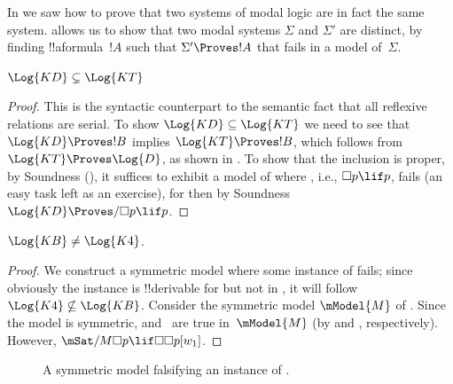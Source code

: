 \documentclass[../../../include/open-logic-section]{subfiles}
\begin{document}


In  we saw how to prove that two systems of modal
logic are in fact the same system.  allows
us to show that two modal systems $\Sigma$ and $\Sigma'$ are distinct,
by finding !!a{formula}~$!A$ such that $\Sigma' \Proves !A$ that fails in
a model of~$\Sigma$.

\begin{prop}
  $\Log{KD} \subsetneq \Log{KT}$
\end{prop}

\begin{proof} This is the syntactic counterpart to the semantic fact
  that all reflexive relations are serial. To show $\Log{KD} \subseteq
  \Log{KT}$ we need to see that $\Log{KD} \Proves !B$ implies
  $\Log{KT} \Proves !B$, which follows from $\Log{KT} \Proves
  \Log{D}$, as shown in
  .  To show
  that the inclusion is proper, by Soundness
  (), it suffices to exhibit a model of
   where , i.e., $\Box p \lif p$, fails (an
  easy task left as an exercise), for then by Soundness $\Log{KD}
  \Proves/ \Box p \lif p$.
\end{proof}

\begin{prop}
  $\Log{KB} \neq \Log{K4}$. 
\end{prop}

\begin{proof}
  We construct a symmetric model where some instance of  fails;
  since obviously the instance is !!{derivable} for  but not
  in , it will follow $\Log{K4} \nsubseteq \Log{KB}$.
  Consider the symmetric model $\mModel{M}$ of . Since
  the model is symmetric,  and~ are true in~$\mModel{M}$
  (by  and
  , respectively). However,
  $\mSat/{M}{\Box p \lif \Box\Box p}[w_1]$.
\end{proof}

\begin{figure}[htpb]
  \centering
  \caption{A symmetric model falsifying an instance of .}
\end{figure}
 
\end{document}
